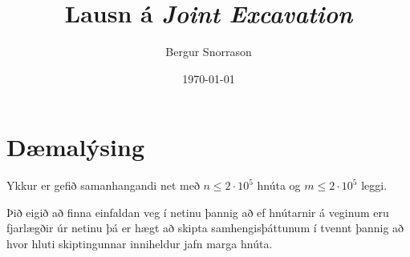 \title{Lausn á \emph{Joint Excavation}}
\author{Bergur Snorrason}
\date{\today}



\frame{\titlepage}

\section{Dæmalýsing}
{
	{
		\item<1-> Ykkur er gefið samanhangandi net með $n \leq 2 \cdot 10^5$ hnúta og $m \leq 2 \cdot 10^5$ leggi.
		\item<2-> Þið eigið að finna einfaldan veg í netinu þannig að ef hnútarnir á veginum eru fjarlægðir úr netinu þá 
					er hægt að skipta samhengisþáttunum í tvennt þannig að hvor hluti skiptingunnar inniheldur jafn marga hnúta.
	}
}

